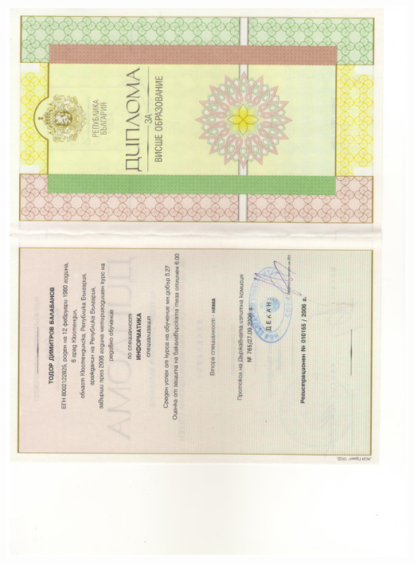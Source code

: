 \documentclass[english,a4paper]{europasscv}
\begin{document}
\includegraphics[width=\textwidth,height=\textheight,keepaspectratio]{DiplomaNBU2006_1}
\end{document}
